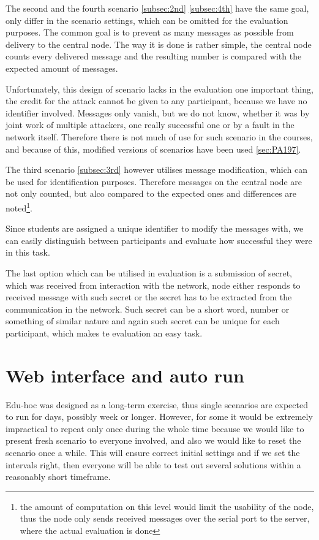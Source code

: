 \documentclass[
  print, %
  table,   %
  nolof,     %
  nolot,     %
           oneside
]{fithesis3}
\begin{document}
  The second and the fourth scenario \ref{subsec:2nd} \ref{subsec:4th} have the same goal, only differ in the scenario settings, which can be omitted for the evaluation purposes. The common goal is to prevent as many messages as possible from delivery to the central node. The way it is done is rather simple, the central node counts every delivered message and the resulting number is compared with the expected amount of messages.

  Unfortunately, this design of scenario lacks in the evaluation one important thing, the credit for the attack cannot be given to any participant, because we have no identifier involved. Messages only vanish, but we do not know, whether it was by joint work of multiple attackers, one really successful one or by a fault in the network itself. Therefore there is not much of use for such scenario in the courses, and because of this, modified versions of scenarios have been used \ref{sec:PA197}.

  The third scenario \ref{subsec:3rd} however utilises message modification, which can be used for identification purposes. Therefore messages on the central node are not only counted, but alco compared to the expected ones and differences are noted\footnote{the amount of computation on this level would limit the usability of the node, thus the node only sends received messages over the serial port to the server, where the actual evaluation is done}.

  Since students are assigned a unique identifier to modify the messages with, we can easily distinguish between participants and evaluate how successful they were in this task.

  The last option which can be utilised in evaluation is a submission of secret, which was received from interaction with the network, node either responds to received message with such secret or the secret has to be extracted from the communication in the network. Such secret can be a short word, number or something of similar nature and again such secret can be unique for each participant, which makes te evaluation an easy task.
  \section{Web interface and auto run}
  Edu-hoc was designed as a long-term exercise, thus single scenarios are expected to run for days, possibly week or longer. However, for some it would be extremely impractical to repeat only once during the whole time because we would like to present fresh scenario to everyone involved,  and also we would like to reset the scenario once a while. This will ensure correct initial settings and if we set the intervals right, then everyone will be able to test out several solutions within a reasonably short timeframe.
\end{document}
